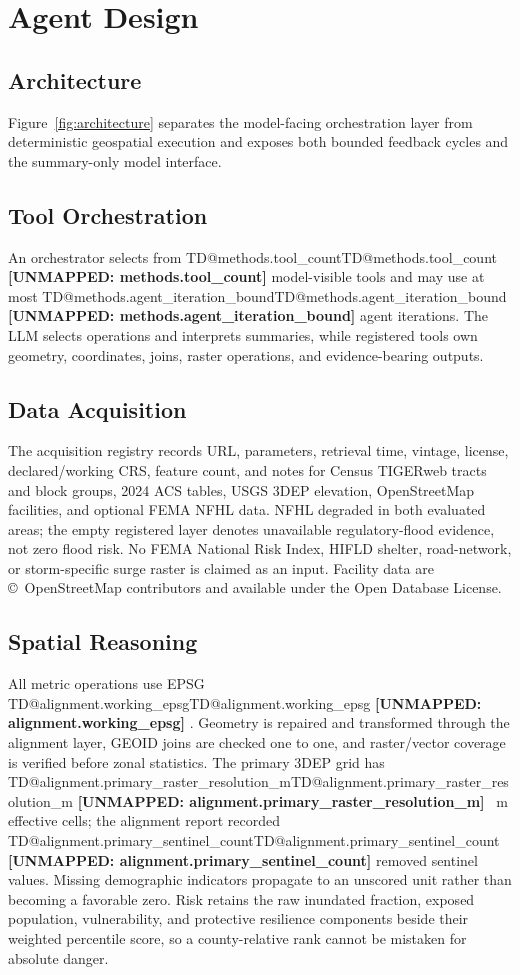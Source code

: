 \documentclass[sigconf,nonacm]{acmart}
\makeatletter
\newcommand{\TD}[1]{%
  \ifcsname TD@#1\endcsname\csname TD@#1\endcsname%
  \else\textbf{[UNMAPPED: #1]}\fi%
}
\makeatother
\begin{document}
\section{Agent Design}

\subsection{Architecture}

Figure~\ref{fig:architecture} separates the model-facing orchestration layer
from deterministic geospatial execution and exposes both bounded feedback
cycles and the summary-only model interface.

\subsection{Tool Orchestration}

An orchestrator selects from \TD{methods.tool_count} model-visible tools and may
use at most \TD{methods.agent_iteration_bound} agent iterations. The LLM selects operations
and interprets summaries, while registered tools own geometry, coordinates,
joins, raster operations, and evidence-bearing outputs.

\subsection{Data Acquisition}

The acquisition registry records URL, parameters, retrieval time, vintage,
license, declared/working CRS, feature count, and notes for Census TIGERweb
tracts and block groups, 2024 ACS tables, USGS 3DEP elevation, OpenStreetMap
facilities, and optional FEMA NFHL data. NFHL degraded in both evaluated areas;
the empty registered layer denotes unavailable regulatory-flood evidence, not
zero flood risk. No FEMA National Risk Index, HIFLD shelter, road-network, or
storm-specific surge raster is claimed as an input. Facility data are \copyright~OpenStreetMap
contributors and available under the Open Database License.

\subsection{Spatial Reasoning}

All metric operations use EPSG~\TD{alignment.working_epsg}. Geometry is repaired
and transformed through the alignment layer, GEOID joins are checked one to one,
and raster/vector coverage is verified before zonal statistics. The primary
3DEP grid has \TD{alignment.primary_raster_resolution_m}~m effective cells; the
alignment report recorded \TD{alignment.primary_sentinel_count} removed
sentinel values. Missing demographic indicators propagate to an unscored unit
rather than becoming a favorable zero. Risk retains the raw inundated fraction,
exposed population, vulnerability, and protective resilience components beside
their weighted percentile score, so a county-relative rank cannot be mistaken
for absolute danger.
\end{document}
